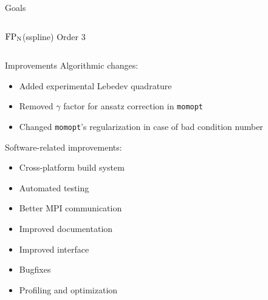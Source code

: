 \documentclass{beamer}
\newcommand{\FPN}{\ensuremath{\textnormal{FP}_\textnormal{N}}\xspace}
\begin{document}
\begin{frame}{Goals}
\begin{columns}
            \FPN(sspline) Order 3
        \end{columns}
    \end{frame}

    \begin{frame}{Improvements}
        Algorithmic changes:
        \begin{itemize}
            \item Added experimental Lebedev quadrature
            \item Removed $\gamma$ factor for ansatz correction in \texttt{momopt}
            \item Changed \texttt{momopt}'s regularization in case of bad condition number
        \end{itemize}

        \vfill

        Software-related improvements:
        \begin{itemize}
            \item Cross-platform build system
            \item Automated testing
            \item Better MPI communication
            \item Improved documentation
            \item Improved interface
            \item Bugfixes
            \item Profiling and optimization
        \end{itemize}
    \end{frame}
\end{document}
